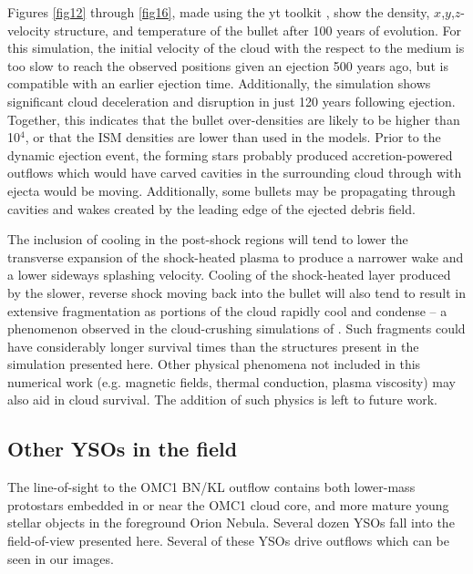 \documentclass{aa}
\begin{document}
Figures \ref{fig12} through \ref{fig16}, made using the yt toolkit \citep{Turk2011},
show the density,  $x$,$y$,$z$-velocity 
structure,   and temperature of the bullet after 100 years of evolution. 
For this simulation, the initial velocity of the cloud with the respect to the 
medium is too slow to reach the observed positions given an ejection 500 
years ago, but is compatible with an earlier ejection time.  Additionally, 
the simulation shows significant cloud deceleration and disruption in 
just 120 years following ejection.  Together, this indicates that the bullet 
over-densities are likely to be higher than 10$^4$, or that the ISM densities 
are lower than used in the models. Prior to the dynamic ejection event, the 
forming stars probably produced accretion-powered outflows which would 
have carved cavities in the surrounding cloud through with ejecta would 
be moving. Additionally, some bullets may be propagating through cavities 
and wakes created by the leading edge of the ejected debris field.

The inclusion of cooling in the post-shock regions will tend to lower the 
transverse expansion of the shock-heated plasma to produce a narrower 
wake and a lower sideways splashing velocity. Cooling of the shock-heated 
layer produced by the slower, reverse shock moving back into the bullet will 
also tend to result in extensive fragmentation as portions of the cloud rapidly
cool and condense -- a phenomenon observed in the cloud-crushing 
simulations of \citep{Silvia2010, Silvia2012}.  Such fragments could have 
considerably longer survival times than the structures present in the 
simulation presented here.  Other physical phenomena not included in this 
numerical work (e.g. magnetic fields, thermal conduction, plasma viscosity) 
may also aid in cloud survival.  The addition of such physics is left to future work.


\subsection{Other YSOs in the field}

The line-of-sight to the OMC1 BN/KL outflow  contains both lower-mass  
protostars embedded in or near the OMC1 cloud core, and more 
mature young stellar objects in the foreground Orion Nebula.    Several dozen 
YSOs fall into the field-of-view presented here.   Several of these YSOs
drive outflows which can be seen in our images.   
 
\end{document}
